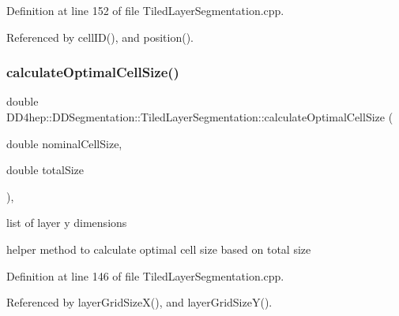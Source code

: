 Definition at line 152 of file Tiled\+Layer\+Segmentation.\+cpp.



Referenced by cell\+I\+D(), and position().

\hypertarget{class_d_d4hep_1_1_d_d_segmentation_1_1_tiled_layer_segmentation_a3cbdc472b5f800c0a1fc99080f1fd72d}{}\label{class_d_d4hep_1_1_d_d_segmentation_1_1_tiled_layer_segmentation_a3cbdc472b5f800c0a1fc99080f1fd72d} 
\subsubsection{\texorpdfstring{calculate\+Optimal\+Cell\+Size()}{calculateOptimalCellSize()}}
{\footnotesize\ttfamily double D\+D4hep\+::\+D\+D\+Segmentation\+::\+Tiled\+Layer\+Segmentation\+::calculate\+Optimal\+Cell\+Size (\begin{DoxyParamCaption}\item[{double}]{nominal\+Cell\+Size,  }\item[{double}]{total\+Size }\end{DoxyParamCaption})\hspace{0.3cm}{\ttfamily [static]}, {\ttfamily [protected]}}



list of layer y dimensions 

helper method to calculate optimal cell size based on total size 

Definition at line 146 of file Tiled\+Layer\+Segmentation.\+cpp.



Referenced by layer\+Grid\+Size\+X(), and layer\+Grid\+Size\+Y().

\hypertarget{class_d_d4hep_1_1_d_d_segmentation_1_1_tiled_layer_segmentation_acda10c2ad2f498c9b3b580baefe9a8cd}{}\label{class_d_d4hep_1_1_d_d_segmentation_1_1_tiled_layer_segmentation_acda10c2ad2f498c9b3b580baefe9a8cd} 
